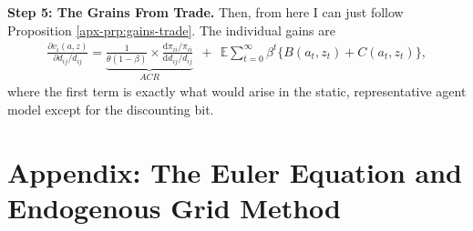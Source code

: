 \documentclass[12pt,pdftex]{article}
\begin{document}
\begin{onehalfspacing}
\textbf{Step 5: The Grains From Trade.} Then, from here I can just follow Proposition \ref{apx-prp:gains-trade}. The individual gains are
{\footnotesize
\begin{align}
\nonumber
\frac{\partial v_i(a, z)}{\partial d_{ij} / d_{ij}} = \underbrace{\frac{1}{\theta (1-\beta)} \times \frac{\mathrm{d} \pi_{ii} / \pi_{ii}}{\mathrm{d}d_{ij} / d_{ij}}}_{ACR} \ \ + \ \
\mathbb{E} \sum_{t = 0}^{\infty} \beta^{t} \bigg \{ B(a_{t},z_{t}) + C(a_{t},z_{t}) \bigg \},
\end{align}
}where the first term is exactly what would arise in the static, representative agent model except for the discounting bit. 

\section{Appendix: The Euler Equation and Endogenous Grid Method}


\end{onehalfspacing}
\end{document}
